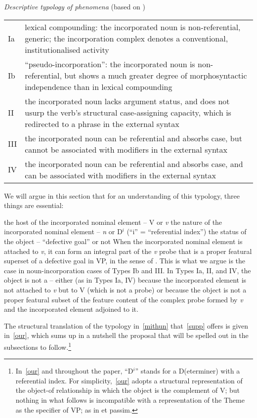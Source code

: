 \documentclass[output=paper]{langsci/langscibook}
\begin{document}
\begin{refcontext}
\ea \emph{Descriptive typology of  phenomena} (based on \citealt{mithun84})\\
\begin{tabularx}{\linewidth}[t]{@{}lQ@{}}
Ia & lexical compounding: the incorporated noun is non-referential, generic; the incorporation
complex denotes a conventional, institutionalised activity\\
Ib & \enquote{pseudo-incorporation}: the incorporated noun is non-referential, but shows a much
greater degree of morphosyntactic independence than in lexical compounding\\
II & the incorporated noun lacks argument status, and does not usurp the verb’s structural
case-assigning capacity, which is redirected to a phrase in the external syntax\\
III & the incorporated noun can be referential and absorbs case, but cannot be associated
with modifiers in the external syntax\\
IV & the incorporated noun can be referential and absorbs case, and can be associated with
modifiers in the external syntax\\
\end{tabularx}\label{mithun}
\z
We will argue in this section that for an understanding of this typology, three
things are essential:

\ea \label{supp}
    \ea  the host of the incorporated nominal element -- V or \emph{v}\label{5a}
    \ex  the nature of the incorporated nominal element -- \emph{n} or D$^i$ (\enquote{i} = \enquote{referential index})\label{5b}
    \ex  the status of the object -- \enquote{defective goal} or not \label{5c}
    \z
\z
When the incorporated nominal element is attached to \emph{v}, it can form an
integral part of the \emph{v} probe that is a proper featural superset of a
defective goal in VP, in the sense of \citet{Roberts2010}. This is what we argue
is the case in noun-incorporation cases of Types Ib and III. In Types
Ia, II, and IV, the object is not a  -- either (as in
Types Ia, IV) because the incorporated element is not attached to
\emph{v} but to V (which is not a probe) or because the object is not a proper
featural subset of the feature content of the complex probe formed by \emph{v}
and the incorporated element adjoined to it.

The structural translation of the typology in~\eqref{mithun} that~\eqref{supp}
offers is given in~\eqref{our}, which sums up in a nutshell the proposal that
will be spelled out in the subsections to follow.\footnote{In~\eqref{our} and
    throughout the paper, \enquote{D$^i$} stands for a D(eterminer) with a
    referential index. For simplicity,~\eqref{our} adopts a structural
representation of the object-of relationship in which the object is the
complement of V; but nothing in what follows is incompatible with a
representation of the Theme as the specifier of VP; as in \citet{halekeyser} et
passim.}


\end{refcontext}
\end{document}
